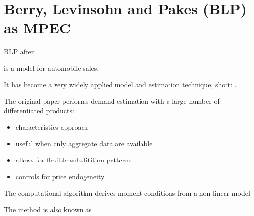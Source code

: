 \documentclass[english]{beamer}
\begin{document}
\section{Berry, Levinsohn and Pakes (BLP) as MPEC}

\begin{frame}
\tableofcontents[currentsection] 
\end{frame}
	
\begin{frame}{BLP after \cite{dube2012improving}}
\begin{midi}
\item \cite{BLP} is a model for automobile sales.
\item It has become a very widely applied model and estimation technique, short: .
\item The original paper performs demand estimation with a large number of differentiated products:
\begin{itemize}
\item characteristics approach
\item useful when only aggregate data are available
\item allows for flexible substitition patterns
\item controls for price endogeneity
\end{itemize}
\item The computational algorithm derives moment conditions from a non-linear model
\item The method is also known as  
\end{midi}
\end{frame}
\end{document}
